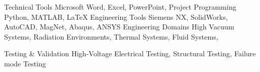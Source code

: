 \vspace{-7mm}


\begin{cvskills}

\cvskill
{Technical Tools}
{Microsoft Word, Excel, PowerPoint, Project}
\cvskill
{Programming} %
{Python, MATLAB, LaTeX} %
\cvskill
{Engineering Tools} %
{Siemens NX, SolidWorks, AutoCAD, MagNet, Abaqus, ANSYS} %
\cvskill
{Engineering Domains}
{High Vacuum Systems, Radiation Environments, Thermal Systems, Fluid Systems,}

\cvskill
{Testing \& Validation}
{High-Voltage Electrical Testing, Structural Testing, Failure mode Testing}

\end{cvskills}